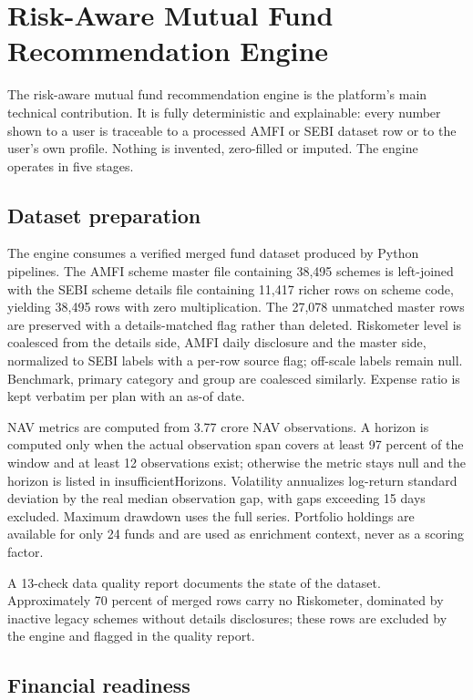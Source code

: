 \section{Risk-Aware Mutual Fund Recommendation Engine}

The risk-aware mutual fund recommendation engine is the platform's main technical contribution. It is fully deterministic and explainable: every number shown to a user is traceable to a processed AMFI or SEBI dataset row or to the user's own profile. Nothing is invented, zero-filled or imputed. The engine operates in five stages.

\subsection{Dataset preparation}

The engine consumes a verified merged fund dataset produced by Python pipelines. The AMFI scheme master file containing 38,495 schemes is left-joined with the SEBI scheme details file containing 11,417 richer rows on scheme code, yielding 38,495 rows with zero multiplication. The 27,078 unmatched master rows are preserved with a details-matched flag rather than deleted. Riskometer level is coalesced from the details side, AMFI daily disclosure and the master side, normalized to SEBI labels with a per-row source flag; off-scale labels remain null. Benchmark, primary category and group are coalesced similarly. Expense ratio is kept verbatim per plan with an as-of date.

NAV metrics are computed from 3.77 crore NAV observations. A horizon is computed only when the actual observation span covers at least 97 percent of the window and at least 12 observations exist; otherwise the metric stays null and the horizon is listed in insufficientHorizons. Volatility annualizes log-return standard deviation by the real median observation gap, with gaps exceeding 15 days excluded. Maximum drawdown uses the full series. Portfolio holdings are available for only 24 funds and are used as enrichment context, never as a scoring factor.

A 13-check data quality report documents the state of the dataset. Approximately 70 percent of merged rows carry no Riskometer, dominated by inactive legacy schemes without details disclosures; these rows are excluded by the engine and flagged in the quality report.

\subsection{Financial readiness}

